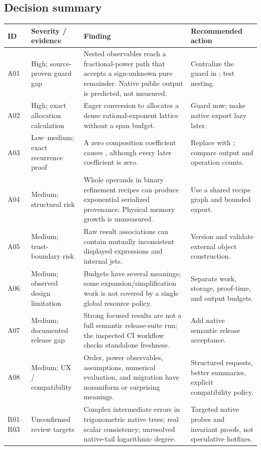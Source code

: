 \documentclass[11pt,letterpaper]{article}
\newcommand{\code}[1]{\texttt{\detokenize{#1}}}
\begin{document}
\subsection{Decision summary}
\begin{longtable}{@{}p{}p{}p{}p{}@{}}
\toprule
ID & Severity / evidence & Finding & Recommended action\\
\midrule\endhead
A01 & High; source-proven guard gap & Nested observables reach a fractional-power path that accepts a sign-unknown pure remainder. Native public output is predicted, not measured. & Centralize the guard in \code{fwdPower}; test nesting.\\
A02 & High; exact allocation calculation & Eager conversion to \code{SeriesData} allocates a dense rational-exponent lattice without a span budget. & Guard now; make native export lazy later.\\
A03 & Low--medium; exact recurrence proof & A zero composition coefficient causes \code{Continue}, although every later coefficient is zero. & Replace with \code{Break}; compare output and operation counts.\\
A04 & Medium; structural risk & Whole operands in binary refinement recipes can produce exponential serialized provenance. Physical memory growth is unmeasured. & Use a shared recipe graph and bounded export.\\
A05 & Medium; trust-boundary risk & Raw result associations can contain mutually inconsistent displayed expressions and internal jets. & Version and validate external object construction.\\
A06 & Medium; observed design limitation & Budgets have several meanings; some expansion/simplification work is not covered by a single global resource policy. & Separate work, storage, proof-time, and output budgets.\\
A07 & Medium; documented release gap & Strong focused results are not a full semantic release-suite run; the inspected CI workflow checks standalone freshness. & Add native semantic release acceptance.\\
A08 & Medium; UX / compatibility & Order, power observables, assumptions, numerical evaluation, and migration have nonuniform or surprising meanings. & Structured requests, better summaries, explicit compatibility policy.\\
R01--R03 & Unconfirmed review targets & Complex intermediate errors in trigonometric native trees; real scalar consistency; unresolved native-tail logarithmic degree. & Targeted native probes and invariant proofs, not speculative hotfixes.\\
\bottomrule
\end{longtable}
\end{document}
